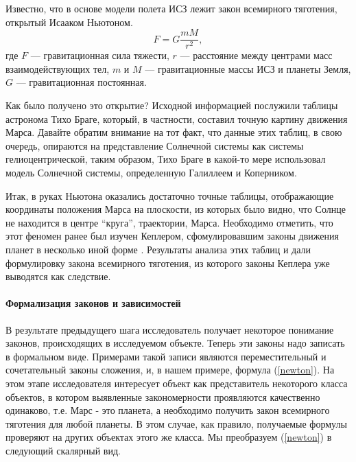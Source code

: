 \documentclass[12pt, openany, twoside]{book} %
\begin{document}
Известно, что в основе модели полета ИСЗ лежит закон всемирного тяготения, открытый Исааком Ньютоном.
\begin{equation}
F = G\frac{mM}{r^2}, \label{newton}
\end{equation}
где $F$ --- гравитационная сила тяжести, $r$ --- расстояние между центрами масс взаимодействующих тел,
$m$ и $M$ --- гравитационные массы ИСЗ и планеты Земля, $G$ --- гравитационная постоянная.

Как было получено это открытие? Исходной информацией послужили таблицы астронома Тихо Браге, который, в частности, составил точную картину движения Марса. Давайте обратим внимание на тот факт, что данные этих таблиц, в свою очередь, опираются на представление Солнечной системы как системы гелиоцентрической, таким образом, Тихо Браге в какой-то мере использовал модель Солнечной системы, определенную Галиллеем и Коперником.

Итак, в руках Ньютона оказались достаточно точные таблицы, отображающие координаты положения Марса на плоскости, из которых было видно, что Солнце не находится в центре ``круга'', траектории, Марса. Необходимо отметить, что этот феномен ранее был изучен Кеплером, сфомулировавшим законы движения планет в несколько иной форме \cite{avanta}. Результаты анализа этих таблиц и дали формулировку закона всемирного тяготения, из которого законы Кеплера уже выводятся как следствие.

\paragraph{Формализация законов и зависимостей} В результате предыдущего шага исследователь получает некоторое понимание законов, происходящих в исследуемом объекте. Теперь эти законы надо записать в формальном виде. Примерами такой записи являются переместительный и сочетательный законы сложения, и, в нашем примере, формула (\ref{newton}). На этом этапе исследователя интересует объект как представитель некоторого класса объектов, в котором выявленные закономерности проявляются качественно одинаково, т.е. Марс - это планета, а необходимо получить закон всемирного тяготения для любой планеты. В этом случае, как правило, получаемые формулы проверяют на других объектах этого же класса. Мы преобразуем (\ref{newton}) в следующий скалярный вид.
\end{document}
